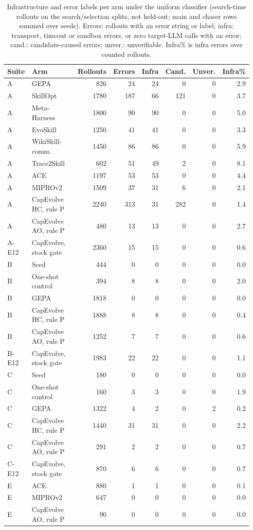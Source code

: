 \begin{table}[t]
\centering
\scriptsize
\caption{Infrastructure and error labels per arm under the uniform classifier (search-time rollouts on the search/selection splits, not held-out; main and chaser rows summed over seeds). Errors: rollouts with an error string or label; infra: transport, timeout or sandbox errors, or zero target-LLM calls with an error; cand.: candidate-caused errors; unver.: unverifiable. Infra\% is infra errors over counted rollouts.}
\label{tab:searchtime-infra}
\begin{tabular}{@{}llrrrrrr@{}}
\toprule
Suite & Arm & Rollouts & Errors & Infra & Cand. & Unver. & Infra\% \\
\midrule
A & GEPA & 826 & 24 & 24 & 0 & 0 & 2.9 \\
A & SkillOpt & 1780 & 187 & 66 & 121 & 0 & 3.7 \\
A & Meta-Harness & 1800 & 90 & 90 & 0 & 0 & 5.0 \\
A & EvoSkill & 1250 & 41 & 41 & 0 & 0 & 3.3 \\
A & WikiSkill-comm. & 1450 & 86 & 86 & 0 & 0 & 5.9 \\
A & Trace2Skill & 602 & 51 & 49 & 2 & 0 & 8.1 \\
A & ACE & 1197 & 53 & 53 & 0 & 0 & 4.4 \\
A & MIPROv2 & 1509 & 37 & 31 & 6 & 0 & 2.1 \\
A & CapEvolve HC, rule P & 2240 & 313 & 31 & 282 & 0 & 1.4 \\
A & CapEvolve AO, rule P & 480 & 13 & 13 & 0 & 0 & 2.7 \\
A-E12 & CapEvolve, stock gate & 2360 & 15 & 15 & 0 & 0 & 0.6 \\
B & Seed & 444 & 0 & 0 & 0 & 0 & 0.0 \\
B & One-shot control & 394 & 8 & 8 & 0 & 0 & 2.0 \\
B & GEPA & 1818 & 0 & 0 & 0 & 0 & 0.0 \\
B & CapEvolve HC, rule P & 1888 & 8 & 8 & 0 & 0 & 0.4 \\
B & CapEvolve AO, rule P & 1252 & 7 & 7 & 0 & 0 & 0.6 \\
B-E12 & CapEvolve, stock gate & 1983 & 22 & 22 & 0 & 0 & 1.1 \\
C & Seed & 180 & 0 & 0 & 0 & 0 & 0.0 \\
C & One-shot control & 160 & 3 & 3 & 0 & 0 & 1.9 \\
C & GEPA & 1322 & 4 & 2 & 0 & 2 & 0.2 \\
C & CapEvolve HC, rule P & 1440 & 31 & 31 & 0 & 0 & 2.2 \\
C & CapEvolve AO, rule P & 291 & 2 & 2 & 0 & 0 & 0.7 \\
C-E12 & CapEvolve, stock gate & 870 & 6 & 6 & 0 & 0 & 0.7 \\
E & ACE & 880 & 1 & 1 & 0 & 0 & 0.1 \\
E & MIPROv2 & 647 & 0 & 0 & 0 & 0 & 0.0 \\
E & CapEvolve AO, rule P & 90 & 0 & 0 & 0 & 0 & 0.0 \\
\bottomrule
\end{tabular}
\end{table}

